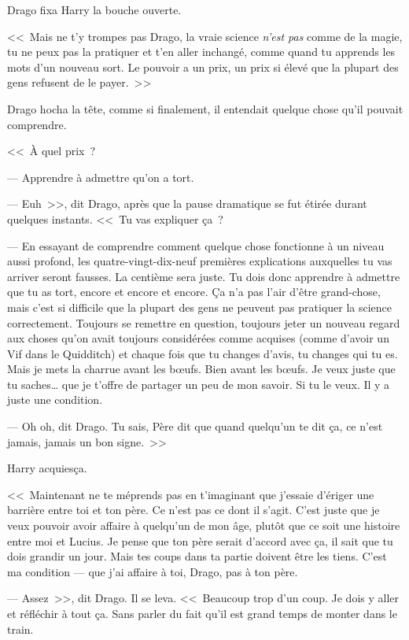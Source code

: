Drago fixa Harry la bouche ouverte.

<<~Mais ne t'y trompes pas Drago, la vraie science \emph{n'est pas} comme de la magie, tu ne peux pas la pratiquer et t'en aller inchangé, comme quand tu apprends les mots d'un nouveau sort. Le pouvoir a un prix, un prix si élevé que la plupart des gens refusent de le payer.~>>

Drago hocha la tête, comme si finalement, il entendait quelque chose qu'il pouvait comprendre.

<<~À quel prix~?

--- Apprendre à admettre qu'on a tort.

--- Euh~>>, dit Drago, après que la pause dramatique se fut étirée durant quelques instants. <<~Tu vas expliquer ça~?

--- En essayant de comprendre comment quelque chose fonctionne à un niveau aussi profond, les quatre-vingt-dix-neuf premières explications auxquelles tu vas arriver seront fausses. La centième sera juste. Tu dois donc apprendre à admettre que tu as tort, encore et encore et encore. Ça n'a pas l'air d'être grand-chose, mais c'est si difficile que la plupart des gens ne peuvent pas pratiquer la science correctement. Toujours se remettre en question, toujours jeter un nouveau regard aux choses qu'on avait toujours considérées comme acquises (comme d'avoir un Vif dans le Quidditch) et chaque fois que tu changes d'avis, tu changes qui tu es. Mais je mets la charrue avant les bœufs. Bien avant les bœufs. Je veux juste que tu saches… que je t'offre de partager un peu de mon savoir. Si tu le veux. Il y a juste une condition.

--- Oh oh, dit Drago. Tu sais, Père dit que quand quelqu'un te dit ça, ce n'est jamais, jamais un bon signe.~>>

Harry acquiesça.

<<~Maintenant ne te méprends pas en t'imaginant que j'essaie d'ériger une barrière entre toi et ton père. Ce n'est pas ce dont il s'agit. C'est juste que je veux pouvoir avoir affaire à quelqu'un de mon âge, plutôt que ce soit une histoire entre moi et Lucius. Je pense que ton père serait d'accord avec ça, il sait que tu dois grandir un jour. Mais tes coups dans ta partie doivent être les tiens. C'est ma condition — que j'ai affaire à toi, Drago, pas à ton père.

--- Assez~>>, dit Drago. Il se leva. <<~Beaucoup trop d'un coup. Je dois y aller et réfléchir à tout ça. Sans parler du fait qu'il est grand temps de monter dans le train.

